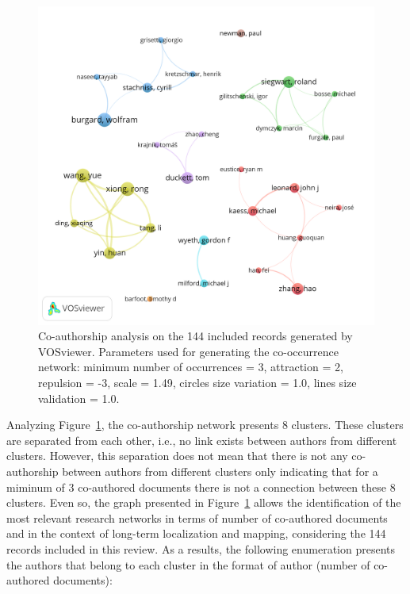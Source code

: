 \begin{figure}[h]
  \centering
  \includegraphics[width=\columnwidth]{figures/authors.png}
  \caption{Co-authorship analysis on the 144 included records generated by VOSviewer. Parameters used for generating the co-occurrence network: minimum number of occurrences = 3, attraction = 2, repulsion = -3, scale = 1.49, circles size variation = 1.0, lines size validation = 1.0.}
  \label{fig:overview:authors}
\end{figure}

Analyzing Figure~\ref{fig:overview:authors}, the co-authorship network presents 8 clusters. These clusters are separated from each other, i.e., no link exists between authors from different clusters. However, this separation does not mean that there is not any co-authorship between authors from different clusters only indicating that for a miminum of 3 co-authored documents there is not a connection between these 8 clusters. Even so, the graph presented in Figure~\ref{fig:overview:authors} allows the identification of the most relevant research networks in terms of number of co-authored documents and in the context of long-term localization and mapping, considering the 144 records included in this review. As a results, the following enumeration presents the authors that belong to each cluster in the format of author (number of co-authored documents):

